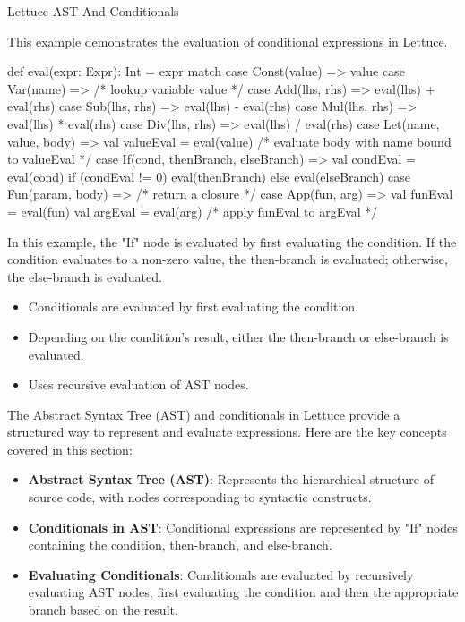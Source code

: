 \begin{notes}{Lettuce AST And Conditionals}
\begin{highlight}
        This example demonstrates the evaluation of conditional expressions in Lettuce.
    
    \begin{code}[Scala]
    def eval(expr: Expr): Int = expr match {
        case Const(value) => value
        case Var(name) => /* lookup variable value */
        case Add(lhs, rhs) => eval(lhs) + eval(rhs)
        case Sub(lhs, rhs) => eval(lhs) - eval(rhs)
        case Mul(lhs, rhs) => eval(lhs) * eval(rhs)
        case Div(lhs, rhs) => eval(lhs) / eval(rhs)
        case Let(name, value, body) => 
            val valueEval = eval(value)
            /* evaluate body with name bound to valueEval */
        case If(cond, thenBranch, elseBranch) => 
            val condEval = eval(cond)
            if (condEval != 0) eval(thenBranch) else eval(elseBranch)
        case Fun(param, body) => /* return a closure */
        case App(fun, arg) => 
            val funEval = eval(fun)
            val argEval = eval(arg)
            /* apply funEval to argEval */
    }
    \end{code}
    
        In this example, the "If" node is evaluated by first evaluating the condition. If the condition evaluates to a non-zero value, the then-branch is evaluated; otherwise, the else-branch is evaluated.
    
        \begin{itemize}
            \item Conditionals are evaluated by first evaluating the condition.
            \item Depending on the condition's result, either the then-branch or else-branch is evaluated.
            \item Uses recursive evaluation of AST nodes.
        \end{itemize}
    
    \end{highlight}
    
    \begin{highlight}
    
        The Abstract Syntax Tree (AST) and conditionals in Lettuce provide a structured way to represent and evaluate expressions. Here are the key concepts covered in this section:
    
    \begin{itemize}
        \item \textbf{Abstract Syntax Tree (AST)}: Represents the hierarchical structure of source code, with nodes corresponding to syntactic constructs.
        \item \textbf{Conditionals in AST}: Conditional expressions are represented by "If" nodes containing the condition, then-branch, and else-branch.
        \item \textbf{Evaluating Conditionals}: Conditionals are evaluated by recursively evaluating AST nodes, first evaluating the condition and then the appropriate branch based on the result.
    \end{itemize}
    

\end{highlight}
\end{notes}
